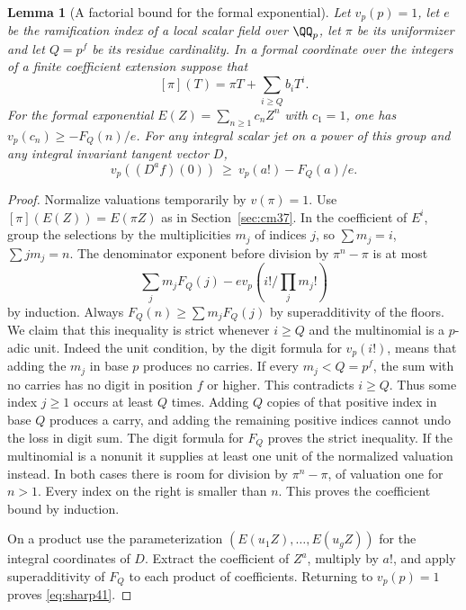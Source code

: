 \documentclass[a4paper,11pt]{article}
\newtheorem{lemma}[proposition]{Lemma}
\theoremstyle{definition}
\theoremstyle{remark}
\numberwithin{equation}{section}
\begin{document}
\begin{lemma}[A factorial bound for the formal exponential]\label{lem:factorial41}
Let \(v_p(p)=1\), let \(e\) be the ramification index of a local scalar field over \(\QQ_p\), let \(\pi\) be its uniformizer and let \(Q=p^f\) be its residue cardinality. In a formal coordinate over the integers of a finite coefficient extension suppose that
\[
      [\pi](T)=\pi T+\sum_{i\ge Q}b_iT^i .
\]
For the formal exponential \(E(Z)=\sum_{n\ge1}c_n Z^n\) with \(c_1=1\), one has \(v_p(c_n)\ge-F_Q(n)/e\). For any integral scalar jet on a power of this group and any integral invariant tangent vector \(D\),
\begin{equation}
             v_p((D^a f)(0))\ \ge\ v_p(a!)-F_Q(a)/e .
                                                                   \label{eq:sharp41}
\end{equation}
\end{lemma}
\begin{proof}
Normalize valuations temporarily by \(v(\pi)=1\). Use \([\pi](E(Z))=E(\pi Z)\) as in Section~\ref{sec:cm37}. In the coefficient of \(E^i\), group the selections by the multiplicities \(m_j\) of indices \(j\), so \(\sum m_j=i\), \(\sum j m_j=n\). The denominator exponent before division by \(\pi^n-\pi\) is at most
\[
       \sum_j m_jF_Q(j)-
                 e v_p\!\left(i!\big/\textstyle\prod_j m_j!\right)
\]
by induction. Always \(F_Q(n)\ge\sum m_jF_Q(j)\) by superadditivity of the floors. We claim that this inequality is strict whenever \(i\ge Q\) and the multinomial is a \(p\)-adic unit. Indeed the unit condition, by the digit formula for \(v_p(i!)\), means that adding the \(m_j\) in base \(p\) produces no carries. If every \(m_j<Q=p^f\), the sum with no carries has no digit in position \(f\) or higher. This contradicts \(i\ge Q\). Thus some index \(j\ge1\) occurs at least \(Q\) times. Adding \(Q\) copies of that positive index in base \(Q\) produces a carry, and adding the remaining positive indices cannot undo the loss in digit sum. The digit formula for \(F_Q\) proves the strict inequality. If the multinomial is a nonunit it supplies at least one unit of the normalized valuation instead. In both cases there is room for division by \(\pi^n-\pi\), of valuation one for \(n>1\). Every index on the right is smaller than \(n\). This proves the coefficient bound by induction.

On a product use the parameterization \((E(u_1Z),\ldots,E(u_gZ))\) for the integral coordinates of \(D\). Extract the coefficient of \(Z^a\), multiply by \(a!\), and apply superadditivity of \(F_Q\) to each product of coefficients. Returning to \(v_p(p)=1\) proves \eqref{eq:sharp41}.
\end{proof}
\end{document}
